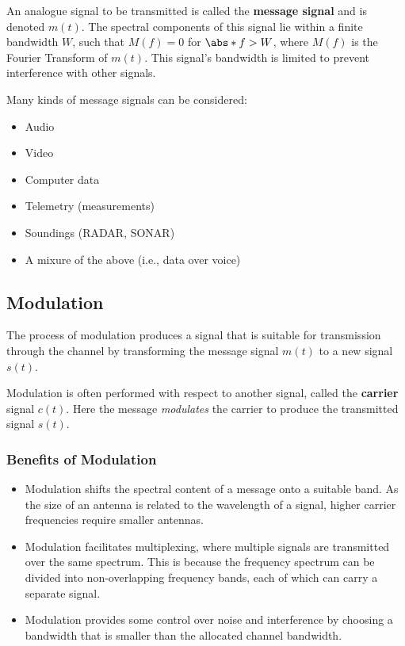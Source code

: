 \documentclass{article}
\begin{document}
An analogue signal to be transmitted is called the \textbf{message signal} and is denoted \(m\left( t \right)\).
The spectral components of this signal lie within a finite bandwidth \(W\), such that \(M\left( f \right) = 0\) for \(\abs*{f} > W\),
where \(M\left( f \right)\) is the Fourier Transform of \(m\left( t \right)\). This signal's bandwidth is limited to prevent
interference with other signals.

Many kinds of message signals can be considered:
\begin{itemize}
    \item Audio
    \item Video
    \item Computer data
    \item Telemetry (measurements)
    \item Soundings (RADAR, SONAR)
    \item A mixure of the above (i.e., data over voice)
\end{itemize}
\subsection{Modulation}
The process of modulation produces a signal that is suitable for transmission through the channel
by transforming the message signal \(m\left( t \right)\) to a new signal \(s\left( t \right)\).

Modulation is often performed with respect to another signal, called the \textbf{carrier} signal \(c\left( t \right)\).
Here the message \textit{modulates} the carrier to produce the transmitted signal \(s\left( t \right)\).
\subsubsection{Benefits of Modulation}
\begin{itemize}
    \item Modulation shifts the spectral content of a message onto a suitable band.
          As the size of an antenna is related to the wavelength of a signal, higher carrier frequencies require smaller antennas.
    \item Modulation facilitates multiplexing, where multiple signals are transmitted over the same spectrum.
          This is because the frequency spectrum can be divided into non-overlapping frequency bands, each of which can carry a separate signal.
    \item Modulation provides some control over noise and interference by choosing a bandwidth that is smaller than the allocated channel bandwidth.
\end{itemize}
\end{document}
